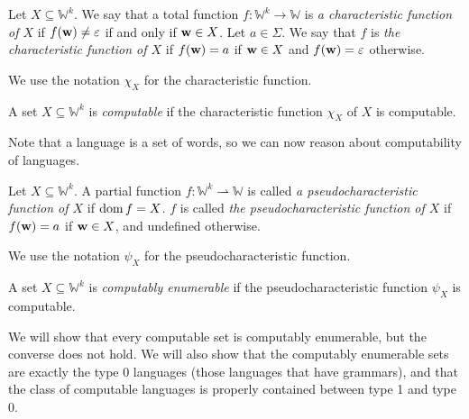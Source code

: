 \begin{definition}
	Let \( X \subseteq \mathbb W^k \).
	We say that a total function \( f \colon \mathbb W^k \to \mathbb W \) is \emph{a characteristic function of \( X \)} if \( f(\vb w) \neq \varepsilon \) if and only if \( \vb w \in X \).
	Let \( a \in \Sigma \).
	We say that \( f \) is \emph{the characteristic function of \( X \)} if \( f(\vb w) = a \) if \( \vb w \in X \) and \( f(\vb w) = \varepsilon \) otherwise.
\end{definition}
We use the notation \( \chi_X \) for the characteristic function.
\begin{definition}
	A set \( X \subseteq \mathbb W^k \) is \emph{computable} if the characteristic function \( \chi_X \) of \( X \) is computable.
\end{definition}
Note that a language is a set of words, so we can now reason about computability of languages.
\begin{definition}
	Let \( X \subseteq \mathbb W^k \).
	A partial function \( f \colon \mathbb W^k \rightharpoonup \mathbb W \) is called \emph{a pseudocharacteristic function of \( X \)} if \( \operatorname{dom} f = X \).
	\( f \) is called \emph{the pseudocharacteristic function of \( X \)} if \( f(\vb w) = a \) if \( \vb w \in X \), and undefined otherwise.
\end{definition}
We use the notation \( \psi_X \) for the pseudocharacteristic function.
\begin{definition}
	A set \( X \subseteq \mathbb W^k \) is \emph{computably enumerable} if the pseudocharacteristic function \( \psi_X \) is computable.
\end{definition}
\begin{remark}
	We will show that every computable set is computably enumerable, but the converse does not hold.
	We will also show that the computably enumerable sets are exactly the type 0 languages (those languages that have grammars), and that the class of computable languages is properly contained between type 1 and type 0.
\end{remark}

